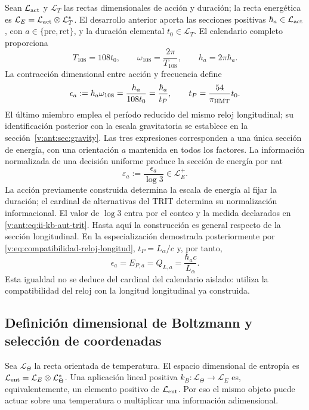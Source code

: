 Sean \(\mathcal L_{\rm act}\) y \(\mathcal L_T\) las rectas
dimensionales de acción y duración; la recta energética es
\(\mathcal L_E=\mathcal L_{\rm act}\otimes\mathcal L_T^*\).
El desarrollo anterior aporta las secciones positivas
\(\hbar_a\in\mathcal L_{\rm act}\), con
\(a\in\{\mathrm{pre},\mathrm{ret}\}\), y la duración elemental
\(t_0\in\mathcal L_T\). El calendario completo proporciona
\[
 T_{108}=108t_0,\qquad
 \omega_{108}=\frac{2\pi}{T_{108}},\qquad
 h_a=2\pi\hbar_a.
\]
La contracción dimensional entre acción y frecuencia define
\begin{equation}
 \epsilon_a:=\hbar_a\omega_{108}
 =\frac{h_a}{108t_0}
 =\frac{\hbar_a}{t_P},\qquad
 t_P=\frac{54}{\pi_{\mathrm{HMT}}}t_0.
 \label{v:ant:eq:ii-kb-aut-energia}
\end{equation}
El último miembro emplea el período reducido del mismo reloj longitudinal;
su identificación posterior con la escala gravitatoria se establece en
la sección~\ref{v:ant:sec:gravity}. Las tres expresiones corresponden a una única
sección de energía, con una orientación \(a\) mantenida en todos
los factores. La información normalizada de una decisión uniforme
produce la sección de energía por nat
\begin{equation}
 \varepsilon_a:=\frac{\epsilon_a}{\log3}\in\mathcal L_E^+.
 \label{v:ant:eq:ii-kb-aut-energia-nat}
\end{equation}
La acción previamente construida determina la escala de energía al
fijar la duración; el cardinal de alternativas del TRIT determina su
normalización informacional. El valor de \(\log3\) entra por el
conteo y la medida declarados en \eqref{v:ant:eq:ii-kb-aut-trit}.
Hasta aquí la construcción es general respecto de la sección longitudinal.
En la especialización demostrada posteriormente por
\eqref{v:eq:compatibilidad-reloj-longitud},
\(t_P=L_\alpha/c\) y, por tanto,
\begin{equation}
 \epsilon_a=E_{P,a}=Q_{L,a}
 =\frac{\hbar_ac}{L_\alpha}.
 \label{v:eq:especializacion-termica-longitudinal}
\end{equation}
Esta igualdad no se deduce del cardinal del calendario aislado: utiliza la
compatibilidad del reloj con la longitud longitudinal ya construida.

\subsection{Definición dimensional de Boltzmann y selección de coordenadas}

Sea \(\mathcal L_\Theta\) la recta orientada de temperatura.
El espacio dimensional de entropía es
\(\mathcal L_{\rm ent}=\mathcal L_E\otimes\mathcal L_\Theta^*\).
Una aplicación lineal positiva
\(k_B:\mathcal L_\Theta\to\mathcal L_E\) es, equivalentemente,
un elemento positivo de \(\mathcal L_{\rm ent}\). Por eso el mismo
objeto puede actuar sobre una temperatura o multiplicar una información
adimensional.

